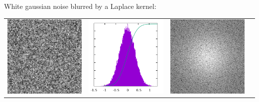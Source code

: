 


White gaussian noise blurred by a Laplace kernel:

\begin{tabular}{cccc}
	\includegraphics{l256.png} &
	\includegraphics{l256_h.png} &
	\includegraphics{l256_f.png} &

\end{tabular}

